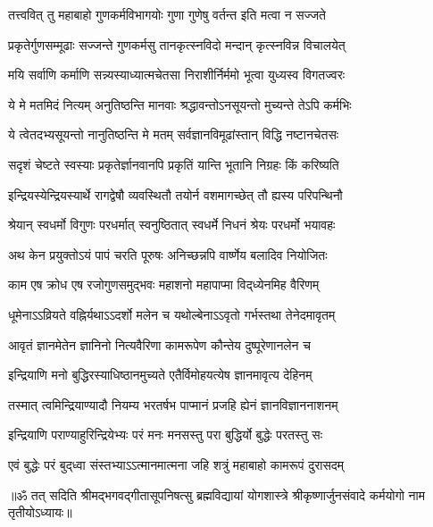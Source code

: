 \twolineshloka
{तत्त्ववित् तु महाबाहो गुणकर्मविभागयोः}
{गुणा गुणेषु वर्तन्त इति मत्वा न सज्जते}%

\twolineshloka
{प्रकृतेर्गुणसम्मूढाः सज्जन्ते गुणकर्मसु}
{तानकृत्स्नविदो मन्दान् कृत्स्नविन्न विचालयेत्}%

\twolineshloka
{मयि सर्वाणि कर्माणि सन्न्यस्याध्यात्मचेतसा}
{निराशीर्निर्ममो भूत्वा युध्यस्व विगतज्वरः}%

\twolineshloka
{ये मे मतमिदं नित्यम् अनुतिष्ठन्ति मानवाः}
{श्रद्धावन्तोऽनसूयन्तो मुच्यन्ते तेऽपि कर्मभिः}%

\twolineshloka
{ये त्वेतदभ्यसूयन्तो नानुतिष्ठन्ति मे मतम्}
{सर्वज्ञानविमूढांस्तान् विद्धि नष्टानचेतसः}%

\twolineshloka
{सदृशं चेष्टते स्वस्याः प्रकृतेर्ज्ञानवानपि}
{प्रकृतिं यान्ति भूतानि निग्रहः किं करिष्यति}%

\twolineshloka
{इन्द्रियस्येन्द्रियस्यार्थे रागद्वेषौ व्यवस्थितौ}
{तयोर्न वशमागच्छेत् तौ ह्यस्य परिपन्थिनौ}%

\twolineshloka
{श्रेयान् स्वधर्मो विगुणः परधर्मात् स्वनुष्ठितात्}
{स्वधर्मे निधनं श्रेयः परधर्मो भयावहः}%


\twolineshloka
{अथ केन प्रयुक्तोऽयं पापं चरति पूरुषः}
{अनिच्छन्नपि वार्ष्णेय बलादिव नियोजितः}%


\twolineshloka
{काम एष क्रोध एष रजोगुणसमुद्भवः}
{महाशनो महापाप्मा विद्‌ध्येनमिह वैरिणम्}%

\twolineshloka
{धूमेनाऽऽव्रियते वह्निर्यथाऽऽदर्शो मलेन च}
{यथोल्बेनाऽऽवृतो गर्भस्तथा तेनेदमावृतम्}%

\twolineshloka
{आवृतं ज्ञानमेतेन ज्ञानिनो नित्यवैरिणा}
{कामरूपेण कौन्तेय दुष्पूरेणानलेन च}%

\twolineshloka
{इन्द्रियाणि मनो बुद्धिरस्याधिष्ठानमुच्यते}
{एतैर्विमोहयत्येष ज्ञानमावृत्य देहिनम्}%

\twolineshloka
{तस्मात् त्वमिन्द्रियाण्यादौ नियम्य भरतर्षभ}
{पाप्मानं प्रजहि ह्येनं ज्ञानविज्ञाननाशनम्}%

\twolineshloka
{इन्द्रियाणि पराण्याहुरिन्द्रियेभ्यः परं मनः}
{मनसस्तु परा बुद्धिर्यो बुद्धेः परतस्तु सः}%

\twolineshloka
{एवं बुद्धेः परं बुद्‍ध्वा संस्तभ्याऽऽत्मानमात्मना}
{जहि शत्रुं महाबाहो कामरूपं दुरासदम्}%

{॥ॐ तत् सदिति श्रीमद्भगवद्गीतासूपनिषत्सु ब्रह्मविद्यायां योगशास्त्रे श्रीकृष्णार्जुनसंवादे कर्मयोगो नाम तृतीयोऽध्यायः॥}

